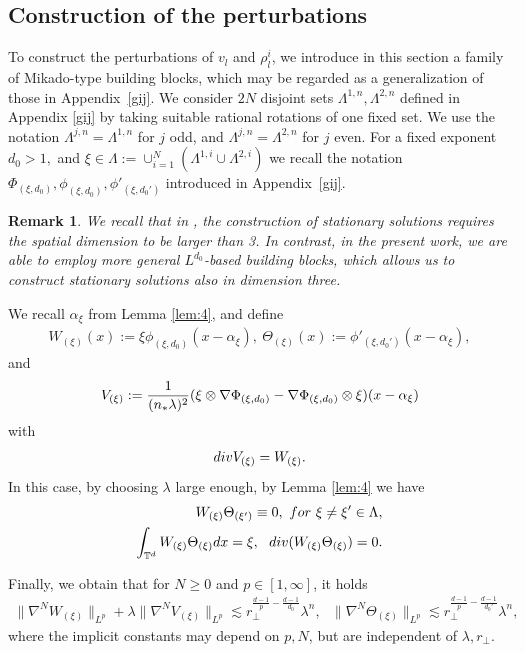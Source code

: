 \documentclass[10pt,a4paper]{amsart}
\numberwithin{equation}{section}
\newtheorem{remark}[theorem]{Remark}
\def\dif{{\mathord{{\rm d}}}}
\def\geq{\geqslant}
\def\div{\mathord{{\rm div}}}
\def\dif{{\mathord{{\rm d}}}}
\def\br{\begin{remark}}
\def\er{\end{remark}}
\def\geq{\geqslant}
\def\div{\mathord{{\rm div}}}
\begin{document}
 \subsection{Construction of the perturbations}\label{sec:5defq+1}
To construct the perturbations of $v_l$ and $\rho^i_l$, we introduce in this section a family of Mikado-type building blocks, which may be regarded as a generalization of those in Appendix~\ref{gij}.   We consider $2N$ disjoint sets $\Lambda^{1,n}, \Lambda^{2,n}$ defined in Appendix \ref{gij} by taking suitable rational rotations of one fixed set. We use the notation   $ \Lambda^{j,n} =  \Lambda^{1,n}$ for $j$ odd, and $ \Lambda^{j,n} =  \Lambda^{2,n}$ for $j$ even. 
For a fixed exponent
$
d_0>1,
$ and $\xi\in\Lambda:=\cup_{i=1}^N(\Lambda^{1,i}\cup \Lambda^{2,i})$
we   recall the notation
$
\Phi_{(\xi,d_0)},
\phi_{(\xi,d_0)},
\phi'_{(\xi,d_0')}
$
introduced in Appendix~\ref{gij}. 

\br
We recall that in \cite{Luo19}, the construction of stationary solutions requires the spatial dimension to be  larger than 3. 
In contrast, in the present work, we are able to employ more general $L^{d_0}$-based building blocks, which allows us to construct stationary solutions  also in dimension three.

\er

We  recall $\alpha_\xi$ from Lemma \ref{lem:4}, and  define 
 \begin{align*}
    W_{(\xi)}(x):=\xi\phi_{(\xi,d_0)}(x-\alpha_\xi),\ 
    \Theta_{ (\xi)}(x):=\phi'_{(\xi,d_0')}(x-\alpha_\xi),
\end{align*} 
 and 
\begin{align}
V_{(\xi)}:=\frac{1}{(n_*\lambda)^2}(\xi\otimes\nabla\Phi_{(\xi,d_0)}-\nabla\Phi_{(\xi,d_0)}\otimes\xi)(x-\alpha_\xi)\notag
\end{align}
with
\begin{align}
\div V_{(\xi)}
=W_{(\xi)} .\label{5:divOmega}
\end{align} 
In this case, by choosing $\lambda$ large enough, by Lemma \ref{lem:4} we have
\begin{align}
  W_{(\xi)}\Theta_{(\xi')}\equiv 0,\ {\rm for}\ \xi\neq\xi'\in\Lambda,\label{bd:wtheta0}\\
\int _{\mathbb{T}^d}W_{(\xi)}\Theta_{(\xi)}\dif x=\xi,\ \ \div (W_{(\xi)}\Theta_{(\xi)})=0.\notag
\end{align}

Finally, we obtain that for $N\geq 0$ and $p\in [1, \infty]$, it holds 
\begin{align}
\|\nabla^NW_{(\xi)}\|_{L^p }+\lambda\|\nabla^NV_{(\xi)}\|_{L^p }
\lesssim r_\perp^{\frac{d-1}{p}-\frac{d-1}{d_0}}\lambda^{n}, \ \ \ \|\nabla^N\Theta_{(\xi)}\|_{L^p }\lesssim r_\perp^{\frac{d-1}{p}-\frac{d-1}{d_0'}}\lambda^{n},& \label{5:int4theta}
\end{align}
where the implicit constants may depend on $p,N$, but are independent of $\lambda,r_\perp$. 
\end{document}
